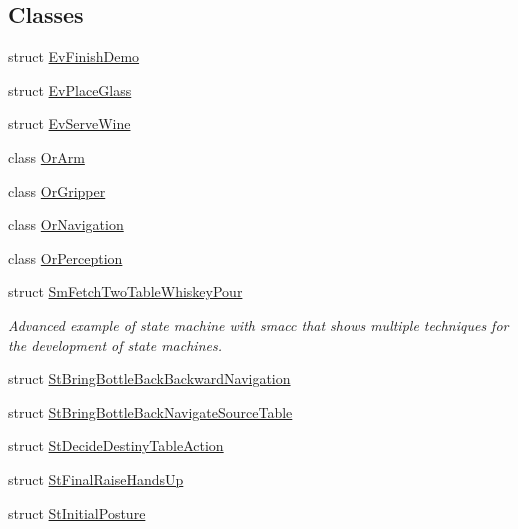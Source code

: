 \subsection*{Classes}
\begin{DoxyCompactItemize}
\item 
struct \hyperlink{structsm__fetch__two__table__whiskey__pour_1_1EvFinishDemo}{Ev\+Finish\+Demo}
\item 
struct \hyperlink{structsm__fetch__two__table__whiskey__pour_1_1EvPlaceGlass}{Ev\+Place\+Glass}
\item 
struct \hyperlink{structsm__fetch__two__table__whiskey__pour_1_1EvServeWine}{Ev\+Serve\+Wine}
\item 
class \hyperlink{classsm__fetch__two__table__whiskey__pour_1_1OrArm}{Or\+Arm}
\item 
class \hyperlink{classsm__fetch__two__table__whiskey__pour_1_1OrGripper}{Or\+Gripper}
\item 
class \hyperlink{classsm__fetch__two__table__whiskey__pour_1_1OrNavigation}{Or\+Navigation}
\item 
class \hyperlink{classsm__fetch__two__table__whiskey__pour_1_1OrPerception}{Or\+Perception}
\item 
struct \hyperlink{structsm__fetch__two__table__whiskey__pour_1_1SmFetchTwoTableWhiskeyPour}{Sm\+Fetch\+Two\+Table\+Whiskey\+Pour}
\begin{DoxyCompactList}\small\item\em Advanced example of state machine with smacc that shows multiple techniques for the development of state machines. \end{DoxyCompactList}\item 
struct \hyperlink{structsm__fetch__two__table__whiskey__pour_1_1StBringBottleBackBackwardNavigation}{St\+Bring\+Bottle\+Back\+Backward\+Navigation}
\item 
struct \hyperlink{structsm__fetch__two__table__whiskey__pour_1_1StBringBottleBackNavigateSourceTable}{St\+Bring\+Bottle\+Back\+Navigate\+Source\+Table}
\item 
struct \hyperlink{structsm__fetch__two__table__whiskey__pour_1_1StDecideDestinyTableAction}{St\+Decide\+Destiny\+Table\+Action}
\item 
struct \hyperlink{structsm__fetch__two__table__whiskey__pour_1_1StFinalRaiseHandsUp}{St\+Final\+Raise\+Hands\+Up}
\item 
struct \hyperlink{structsm__fetch__two__table__whiskey__pour_1_1StInitialPosture}{St\+Initial\+Posture}
\item 

\end{DoxyCompactItemize}
